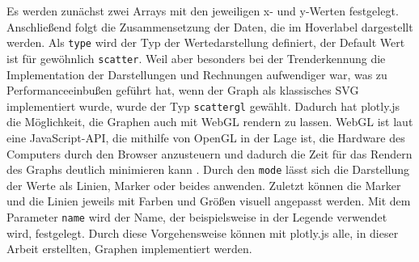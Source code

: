 Es werden zunächst zwei Arrays mit den jeweiligen x- und y-Werten festgelegt. Anschließend folgt die Zusammensetzung der Daten, die im Hoverlabel dargestellt werden. Als \texttt{type} wird der Typ der Wertedarstellung definiert, der Default Wert ist für gewöhnlich \texttt{scatter}. Weil aber besonders bei der Trenderkennung die Implementation der Darstellungen und Rechnungen aufwendiger war, was zu Performanceeinbußen geführt hat, wenn der Graph als klassisches SVG implementiert wurde, wurde der Typ \texttt{scattergl} gewählt. Dadurch hat plotly.js die Möglichkeit, die Graphen auch mit WebGL rendern zu lassen. WebGL ist laut \cite{MDNcontributors.2024b} eine JavaScript-API, die mithilfe von OpenGL in der Lage ist, die Hardware des Computers durch den Browser anzusteuern und dadurch die Zeit für das Rendern des Graphs deutlich minimieren kann \cite{Plotly.2024b}. Durch den \texttt{mode} lässt sich die Darstellung der Werte als Linien, Marker oder beides anwenden. Zuletzt können die Marker und die Linien jeweils mit Farben und Größen visuell angepasst werden. Mit dem Parameter \texttt{name} wird der Name, der beispielsweise in der Legende verwendet wird, festgelegt. 
Durch diese Vorgehensweise können mit plotly.js alle, in dieser Arbeit erstellten, Graphen implementiert werden.
